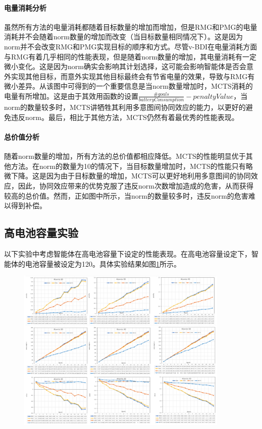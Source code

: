 \paragraph{电量消耗分析}
虽然所有方法的电量消耗都随着目标数量的增加而增加，但是RMG和PMG的电量消耗并不会随着norm数量的增加而改变（当目标数量相同情况下）。这是因为norm并不会改变RMG和PMG实现目标的顺序和方式。尽管v-BDI在电量消耗方面与RMG有着几乎相同的性能表现，但是随着norm数量的增加，其电量消耗有一定微小变化。这是因为norm确实会影响其计划选择，这可能会影响智能体是否会意外实现其他目标，而意外实现其他目标最终会有节省电量的效果，导致与RMG有微小差异。从该图中可得到的一个重要信息是当norm数量增加时，MCTS消耗的电量有所增加。这是由于其效用函数的设置$\frac{\#goals}{batteryConsumption} - penaltyValue$，当norm的数量较多时，MCTS讲牺牲其利用多意图间协同效应的能力，以更好的避免违反norm。最后，相比于其他方法，MCTS仍然有着最优秀的性能表现。
\paragraph{总价值分析}
随着norm数量的增加，所有方法的总价值都相应降低。MCTS的性能明显优于其他方法。在norm的数量为10的情况下，当目标数量增加时，MCTS的性能只有略微下降。这是因为由于目标数量的增加，MCTS可以更好地利用多意图间的协同效应，因此，协同效应带来的优势克服了违反norm次数增加造成的危害，从而获得较高的总价值。然而，正如图中所示，当norm的数量较多时，违反norm的危害难以得到补偿。

\subsection{高电池容量实验}
以下实验中考虑智能体在高电池容量下设定的性能表现。在高电池容量设定下，智能体的电池容量被设定为120。具体实验结果如图\ref{fig:ltl_high}所示。

\begin{figure}[htb]
\centering
\includegraphics[width=0.9\textwidth]{./figs/ltl_high_battery}
\label{fig:ltl_high}
\end{figure}

